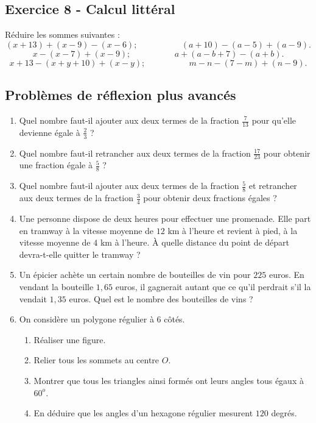 \documentclass[14pt]{extreport}
\theoremstyle{plain}
\begin{document}
\subsection*{Exercice 8 - Calcul littéral}
	Réduire les sommes suivantes : 
 \[ (x + 13) + (x - 9) - (x - 6); \phantom{meowmeow} 
 (a + 10) - (a - 5) + (a - 9). \]
 \[ x - (x - 7)  + (x - 9); \phantom{meowmeow} 
 a + (a - b + 7) - (a + b). \]
 \[ x + 13 - (x + y + 10) + (x - y); \phantom{meowmeow} 
 m - n - (7 - m) + (n - 9).\]
	
    \subsection*{Problèmes de réflexion plus avancés}
\begin{enumerate}
\item Quel nombre faut-il ajouter aux deux termes de la fraction $\frac7{13}$ pour qu'elle devienne égale à $\frac23$ ? 
 \item Quel nombre faut-il retrancher aux deux termes de la fraction $\frac{17}{23}$ pour obtenir une fraction égale à $\frac58$ ? 
 \item Quel nombre faut-il ajouter aux deux termes de la fraction $\frac58$ et retrancher aux deux termes de la fraction $\frac34$ pour obtenir deux fractions égales ? 
 \item Une personne dispose de deux heures pour effectuer une promenade. Elle part en tramway à la vitesse moyenne de $12$ km à l'heure et revient à pied, à la vitesse moyenne de $4$ km à l'heure. À quelle distance du point de départ devra-t-elle quitter le tramway ? 
 \item Un épicier achète un certain nombre de bouteilles de vin pour $225$ euros. En vendant la bouteille $1,65$ euros, il gagnerait autant que ce qu'il perdrait s'il la vendait $1,35$ euros. Quel est le nombre des bouteilles de vins ? 
 
 \item On considère un polygone régulier à $6$ côtés.
 \begin{enumerate}
 \item Réaliser une figure.
 \item Relier tous les sommets au centre $O$. 
 \item Montrer que tous les triangles ainsi formés ont leurs angles tous égaux à $60^o$. 
 \item En déduire que les angles d'un hexagone régulier mesurent $120$ degrés.
\end{enumerate}   


\end{enumerate}
\end{document}

